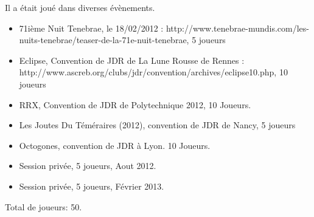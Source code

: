 \documentclass[oneside,12pt]{book}
\begin{document}
\begin{flushleft}
Il a était joué dans diverses évènements. 
\begin{itemize}
\item 71ième Nuit Tenebrae, le 18/02/2012 : http://www.tenebrae-mundis.com/les-nuits-tenebrae/teaser-de-la-71e-nuit-tenebrae, 5 joueurs
\item Eclipse, Convention de JDR de La Lune Rousse de Rennes : http://www.ascreb.org/clubs/jdr/convention/archives/eclipse10.php, 10 joueurs
\item RRX, Convention de JDR de Polytechnique 2012, 10 Joueurs. 
\item Les Joutes Du Téméraires (2012), convention de JDR de Nancy, 5 joueurs
\item Octogones, convention de JDR à Lyon. 10 Joueurs.
\item Session privée, 5 joueurs, Aout 2012.
\item Session privée, 5 joueurs, Février 2013.
\end{itemize}

Total de joueurs: 50.



\end{flushleft}
\end{document}
